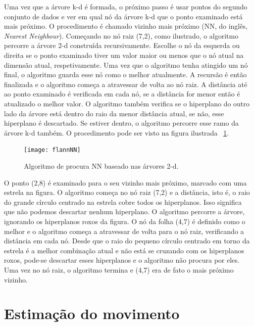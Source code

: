 Uma vez que a árvore k-d é formada, o próximo passo é usar pontos do segundo conjunto de dados e ver em qual nó da árvore k-d que o ponto examinado está mais próximo. O procedimento é chamado vizinho mais próximo (NN, do inglês, \textit{Nearest Neighbour}). Começando no nó raiz (7,2), como ilustrado, o algoritmo percorre a árvore 2-d construída recursivamente. Escolhe o nó da esquerda ou direita se o ponto examinado tiver um valor maior ou menos que o nó atual na dimensão atual, respetivamente. Uma vez que o algoritmo tenha atingido um nó final, o algoritmo guarda esse nó como o melhor atualmente. A recursão é então finalizada e o algoritmo começa a atravessar de volta ao nó raiz. A distância até ao ponto examinado é verificada em cada nó, se a distância for menor então é atualizado o melhor valor. O algoritmo também verifica se o hiperplano do outro lado da árvore está dentro do raio da menor distância atual, se não, esse hiperplano é descartado. Se estiver dentro, o algoritmo percorre esse ramo da árvore k-d também. O procedimento pode ser visto na figura ilustrada ~\ref{fig:flannNN}.

\begin{figure}[h!] %
	\begin{center}
		\leavevmode		
		\texttt{[image: flannNN]}
		\caption{Algoritmo de procura NN baseado nas árvores 2-d.}
		\label{fig:flannNN}
	\end{center}
\end{figure}

O ponto (2,8) é examinado para o seu vizinho mais próximo, marcado com uma estrela na figura. O algoritmo começa no nó raiz (7,2) e a distância, isto é, o raio do grande círculo centrado na estrela cobre todos os hiperplanos. Isso significa que não podemos descartar nenhum hiperplano. O algoritmo percorre a árvore, ignorando os hiperplanos roxos da figura. O nó da folha (4,7) é definido como o melhor e o algoritmo começa a atravessar de volta para o nó raiz, verificando a distância em cada nó. Desde que o raio do pequeno círculo centrado em torno da estrela é a melhor combinação atual e não está se cruzando com os hiperplanos roxos, pode-se descartar esses hiperplanos e o algoritmo não procura por eles. Uma vez no nó raiz, o algoritmo termina e (4,7) era de fato o mais próximo vizinho.

\section{Estimação do movimento}

